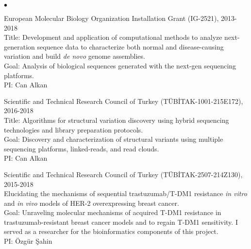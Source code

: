 \documentclass[margin,line]{res}
\newenvironment{list2}{
  \begin{list}{$\bullet$}{%
      \setlength{\itemsep}{0.1cm}
      \setlength{\parsep}{0in} \setlength{\parskip}{0in}
      \setlength{\topsep}{0in} \setlength{\partopsep}{0in} 
      \setlength{\leftmargin}{0.2in}}}{\end{list}}
\begin{document}
\begin{resume}
\begin{list2}
                                       
                                     \item
                                         European Molecular Biology Organization Installation Grant (IG-2521), 2013-2018 \\
                                         Title: Development and application of computational methods to analyze next-generation sequence data to characterize both normal and disease-causing variation and build \textit{de novo} genome assemblies.\\
                                         Goal: Analysis of biological sequences generated with the next-gen sequencing platforms.\\
                                         PI: Can Alkan
                                       \item
                                         Scientific and Technical Research Council of Turkey (T\"{U}B\.{I}TAK-1001-215E172), 2016-2018\\
                                         Title: Algorithms for structural variation discovery using hybrid sequencing technologies and library preparation protocols.\\
                                         Goal: Discovery and characterization of structural variants using multiple sequencing platforms, linked-reads, and read clouds.\\
                                         PI: Can Alkan
                                         \item
                                         Scientific and Technical Research Council of Turkey (T\"{U}B\.{I}TAK-2507-214Z130), 2015-2018\\
                                         Elucidating the mechanisms of sequential trastuzumab/T-DM1 resistance \textit{in vitro} and \textit{in vivo} models of HER-2
                                         overexpressing breast cancer.\\
                                         Goal: Unraveling molecular mechanisms of acquired T-DM1 resistance in trastuzumab-resistant breast 
                                         cancer models and to regain T-DM1 sensitivity. I served as a researcher 
                                         for the bioinformatics components of this project.\\
                                         PI: Özgür Şahin
\clearpage
                                       \item

\end{list2}
\end{resume}
\end{document}
